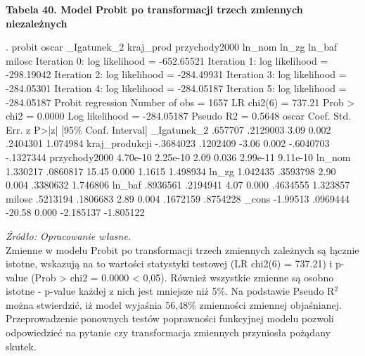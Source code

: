 \vspace{0.5cm}
\textbf{Tabela 40. Model Probit po transformacji trzech zmiennych niezależnych}
\begin{stlog}
. probit oscar _Igatunek_2 kraj_prod przychody2000 ln_nom ln_zg ln_baf milosc 
{\smallskip}
Iteration 0:   log likelihood = -652.65521  
Iteration 1:   log likelihood = -298.19042  
Iteration 2:   log likelihood = -284.49931  
Iteration 3:   log likelihood = -284.05301  
Iteration 4:   log likelihood = -284.05187  
Iteration 5:   log likelihood = -284.05187  
{\smallskip}
Probit regression                                 Number of obs   =       1657
                                                  LR chi2(6)      =     737.21
                                                  Prob > chi2     =     0.0000
Log likelihood = -284.05187                       Pseudo R2       =     0.5648
{\smallskip}
         oscar {\VBAR}      Coef.   Std. Err.      z    P>|z|     [95\% Conf. Interval]
   _Igatunek_2 {\VBAR}    .657707   .2129003     3.09   0.002     .2404301    1.074984
kraj_produkcji {\VBAR}  -.3684023   .1202409    -3.06   0.002    -.6040703   -.1327344
 przychody2000 {\VBAR}   4.70e-10   2.25e-10     2.09   0.036     2.99e-11    9.11e-10
        ln_nom {\VBAR}   1.330217   .0860817    15.45   0.000       1.1615    1.498934
         ln_zg {\VBAR}   1.042435   .3593798     2.90   0.004     .3380632    1.746806
        ln_baf {\VBAR}   .8936561   .2194941     4.07   0.000     .4634555    1.323857
        milosc {\VBAR}   .5213194   .1806683     2.89   0.004     .1672159    .8754228
         _cons {\VBAR}   -1.99513   .0969444   -20.58   0.000    -2.185137   -1.805122
\end{stlog}
\textit{\footnotesize{Źródło: Opracowanie własne.}} \\

Zmienne w modelu Probit po transformacji trzech zmiennych zależnych są łącznie istotne, wskazują na to wartości statystyki testowej (LR chi2(6) = 737.21) i p-value (Prob > chi2 = 0.0000 < 0,05). Również wszystkie zmienne są osobno istotne - p-value każdej z nich jest mniejsze niż 5\%. Na podstawie Pseudo R$^2$ można stwierdzić, iż model wyjaśnia 56,48\% zmienności zmiennej objaśnianej. Przeprowadzenie ponownych testów poprawności funkcyjnej modelu pozwoli odpowiedzieć na pytanie czy transformacja zmiennych przyniosła pożądany skutek. 

